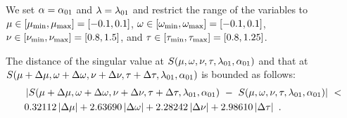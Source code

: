 \documentclass{article}
\begin{document}
\begin{lemma}
\label{lem:meanValue}
We set
$\alpha = \alpha_{\rm 01}$ and $\lambda=\lambda_{\rm 01}$ and
restrict the range of the variables to
$\mu \in [\mu_{\rm min},\mu_{\rm max}]=[-0.1,0.1]$,
$\omega \in [\omega_{\rm min},\omega_{\rm max}]=[-0.1,0.1]$,
$\nu \in [\nu_{\rm min},\nu_{\rm max}]=[0.8,1.5]$, and
$\tau \in [\tau_{\rm min},\tau_{\rm max}]=[0.8,1.25]$.

The distance of the singular value at
$S(\mu,\omega,\nu,\tau,\lambda_{\rm 01},\alpha_{\rm 01})$
and that at 
$S(\mu + \Delta \mu,\omega + \Delta \omega,\nu + \Delta \nu,\tau + \Delta \tau,\lambda_{\rm 01},\alpha_{\rm 01})$
is bounded as follows:
\begin{align}
&\left|S(\mu + \Delta \mu,\omega + \Delta \omega,\nu + \Delta
  \nu,\tau + \Delta \tau,\lambda_{\rm 01},\alpha_{\rm 01}) 
\ - \ 
S(\mu,\omega,\nu,\tau,\lambda_{\rm 01},\alpha_{\rm 01}) \right|
\ < \\ \nonumber
&0.32112 \left|\Delta \mu\right| + 2.63690\left|\Delta \omega\right| + 2.28242  \left|\Delta \nu\right| + 2.98610 \left|\Delta \tau\right| \ .
\end{align}
\end{lemma}
\end{document}
